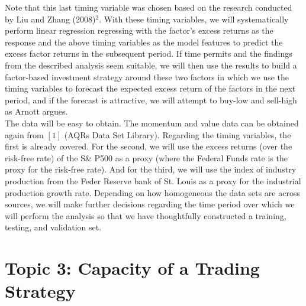 \documentclass[12pt]{article}
\begin{document}
Note that this last timing variable was chosen based on the research conducted by Liu and Zhang (2008)$^2$. With these timing variables, we will systematically perform linear regression regressing with the factor's excess returns as the response and the above timing variables as the model features to predict the excess factor returns in the subsequent period. If time permits and the findings from the described analysis seem suitable, we will then use the results to build a factor-based investment strategy around these two factors in which we use the timing variables to forecast the expected excess return of the factors in the next period, and if the forecast is attractive, we will attempt to buy-low and sell-high as Arnott argues. \\
The data will be easy to obtain. The momentum and value data can be obtained again from $[1]$ (AQRs Data Set Library). Regarding the timing variables, the first is already covered. For the second, we will use the excess returns (over the risk-free rate) of the S\& P500 as a proxy (where the Federal Funds rate is the proxy for the risk-free rate). And for the third, we will use the index of industry production from the Feder Reserve bank of St. Louis as a proxy for the industrial production growth rate. Depending on how homogeneous the data sets are across sources, we will make further decisions regarding the time period over which we will perform the analysis so that we have thoughtfully constructed a training, testing, and validation set.  

\section{Topic 3: Capacity of a Trading Strategy}
\end{document}
